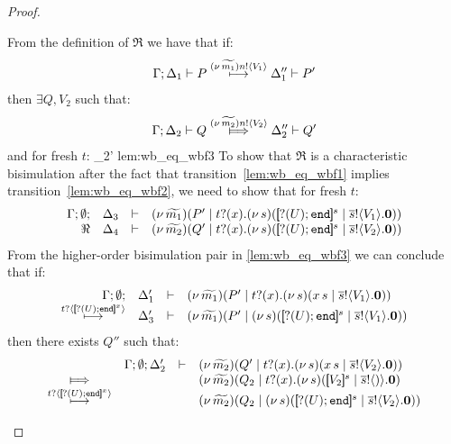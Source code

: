 \begin{proof}
\begin{enumerate}
\begin{itemize}
							\noi From the definition of $\Re$ we have that if:
							\begin{eqnarray}
								\Gamma; \Delta_1 \vdash P \stackrel{(\nu\, \widetilde{m_1}) n ! \langle V_1 \rangle}{\longmapsto} \Delta_1'' \vdash P'
								\label{lem:wb_eq_wbf1}
							\end{eqnarray}
							then $\exists Q, V_2$ such that:
							\begin{eqnarray}
								\horel{\Gamma}{\Delta_2}{Q}{\Hby{\news{\widetilde{m_2}} \bactout{n}{V_2}}}{\Delta_2''}{Q'}
								\label{lem:wb_eq_wbf2}
							\end{eqnarray}
							and for fresh $t$:
								{\hwb}
								{\Delta_2'}{}
								{lem:wb_eq_wbf3}
							\noi 
							To show that $\Re$ is a characteristic bisimulation
							after the fact that transition~\eqref{lem:wb_eq_wbf1} implies transition~\eqref{lem:wb_eq_wbf2},
							we need to show that for fresh $t$:
							\begin{eqnarray}
								\mhorel{\Gamma}{\Delta_3}{\newsp{\widetilde{m_1}}{P' \Par \fotrigger{t}{x}{s}{\btinp{U} \tinact}{V_1}}}
								{\Re}
								{\Delta_4}{}{\newsp{\widetilde{m_2}}{Q' \Par \fotrigger{t}{x}{s}{\btinp{U} \tinact}{V_2}}}
								\label{lem:wb_eq_wbf4}
							\end{eqnarray}
							\noi
							From the higher-order bisimulation pair in \eqref{lem:wb_eq_wbf3} we can
							conclude that if:
							\[
								\mhorel{\Gamma}{\Delta_1'}{\newsp{\widetilde{m_1}}{P' \Par \hotrigger{t}{x}{s}{V_1}}}
								{\hby{\bactinp{t}{\map{\btinp{U} \tinact}^{x}}}}
								{\Delta_3'}{}{\newsp{\widetilde{m_1}}{P' \Par \newsp{s}{\map{\btinp{U} \tinact}^{s} \Par \bout{\dual{s}}{V_1} \inact}}}
							\]
							then there exists $Q''$ such that:
							\begin{eqnarray}
								\begin{array}{crll}
									& \Gamma; \es; \Delta_2' & \proves &		
									\newsp{\widetilde{m_2}}{Q' \Par \hotrigger{t}{x}{s}{V_2}}
									\\
									\Hby{} &&&
									\newsp{\widetilde{m_2}}{Q_2 \Par \fotrigger{t}{x}{s}{V_2}}
									\\
									{\hby{\bactinp{t}{\map{\btinp{U} \tinact}^{x}}}}& & &
									\newsp{\widetilde{m_2}}{Q_2 \Par \newsp{s}{\map{\btinp{U} \tinact}^{s} \Par \bout{\dual{s}}{V_2} \inact}}
									\\

\end{array}
\end{eqnarray}
\end{itemize}
\end{enumerate}
\end{proof}

